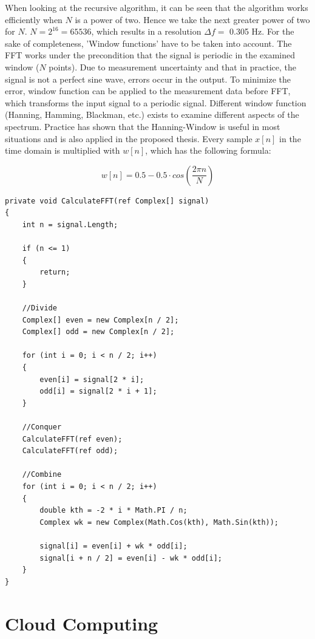 When looking at the recursive algorithm, it can be seen that the algorithm works efficiently when $N$ is a power of two. Hence we take the next greater power of two for $N$. $N = 2^{16} = 65536$, which results in a resolution $\Delta f = $ 0.305 Hz.
\newline
\newline
For the sake of completeness, 'Window functions' have to be taken into account. The FFT works under the precondition that the signal is periodic in the examined window ($N$ points). Due to measurement uncertainty and that in practice, the signal is not a perfect sine wave, errors occur in the output. To minimize the error, window function can be applied to the measurement data before FFT, which transforms the input signal to a periodic signal. Different window function (Hanning, Hamming, Blackman, etc.) exists to examine different aspects of the spectrum. Practice has shown that the Hanning-Window is useful in most situations and is also applied in the proposed thesis. Every sample $x[n]$ in the time domain is multiplied with $w[n]$, which has the following formula\cite{signalverarbeitung}:

\[w[n] = 0.5 - 0.5 \cdot cos(\frac{2 \pi n}{N})\]

\begin{lstlisting}[frame=single]
private void CalculateFFT(ref Complex[] signal)
{
	int n = signal.Length;

	if (n <= 1)
	{
		return;
	}

	//Divide
	Complex[] even = new Complex[n / 2];
	Complex[] odd = new Complex[n / 2];

	for (int i = 0; i < n / 2; i++)
	{
		even[i] = signal[2 * i];
		odd[i] = signal[2 * i + 1];
	}

	//Conquer
	CalculateFFT(ref even);
	CalculateFFT(ref odd);

	//Combine
	for (int i = 0; i < n / 2; i++)
	{
		double kth = -2 * i * Math.PI / n;
		Complex wk = new Complex(Math.Cos(kth), Math.Sin(kth));

		signal[i] = even[i] + wk * odd[i];
		signal[i + n / 2] = even[i] - wk * odd[i];
	}
}
\end{lstlisting}
\section{Cloud Computing}

